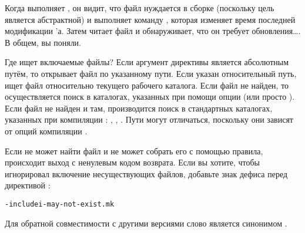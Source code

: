 Когда \GNUmake{} выполняет \Makefile{}, он видит, что файл нуждается в
сборке (поскольку цель  является абстрактной) и
выполняет команду , которая изменяет время последней
модификации \Makefile{}'а. Затем \GNUmake{} читает файл и
обнаруживает, что он требует обновления\ldots{}. В общем, вы поняли.

Где \GNUmake{} ищет включаемые файлы? Если аргумент директивы
 является абсолютным путём, то \GNUmake{} открывает
файл по указанному пути. Если указан относительный путь, \GNUmake{}
ищет файл относительно текущего рабочего каталога. Если файл не
найден, то осуществляется поиск в каталогах, указанных при помощи опции
 (или просто ). Если
файл не найден и там, производится поиск в стандартных каталогах,
указанных при компиляции \GNUmake{}: ,
, . Пути могут
отличаться, поскольку они зависят от опций компиляции \GNUmake{}.

Если \GNUmake{} не может найти файл и не может собрать его с помощью
правила, происходит выход с ненулевым кодом возврата. Если вы хотите,
чтобы \GNUmake{} игнорировал включение несуществующих файлов, добавьте
знак дефиса перед директивой :

\begin{alltt}
\footnotesize
-include i-may-not-exist.mk
\end{alltt}

Для обратной совместимости с другими версиями \GNUmake{} слово
 является синонимом .
